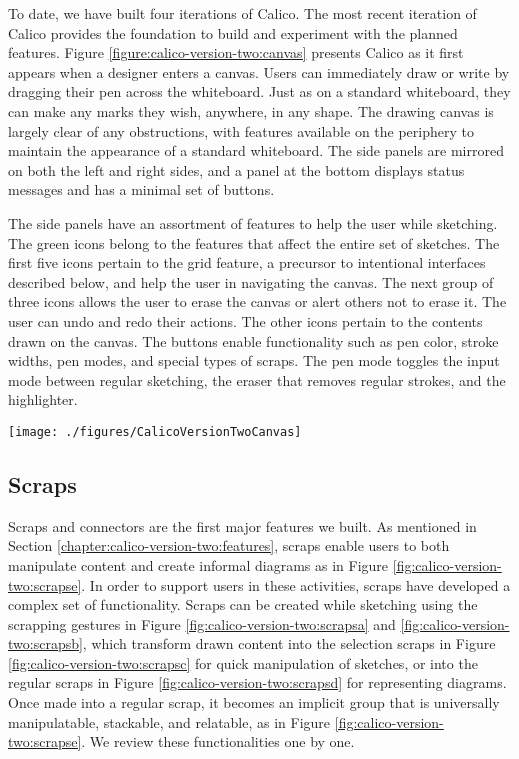 To date, we have built four iterations of Calico. The most recent iteration of Calico provides the foundation to build and experiment with the planned features. Figure \ref{figure:calico-version-two:canvas} presents Calico as it first appears when a designer enters a canvas. Users can immediately draw or write by dragging their pen across the whiteboard. Just as on a standard whiteboard, they can make any marks they wish, anywhere, in any shape. The drawing canvas is largely clear of any obstructions, with features available on the periphery to maintain the appearance of a standard whiteboard. The side panels are mirrored on both the left and right sides, and a panel at the bottom displays status messages and has a minimal set of buttons. 

The side panels have an assortment of features to help the user while sketching. The green icons belong to the features that affect the entire set of sketches. The first five icons pertain to the grid feature, a precursor to intentional interfaces described below, and help the user in navigating the canvas. The next group of three icons allows the user to erase the canvas or alert others not to erase it. The user can undo and redo their actions. The other icons pertain to the contents drawn on the canvas. The buttons enable functionality such as pen color, stroke widths, pen modes, and special types of scraps. The pen mode toggles the input mode between regular sketching, the eraser that removes regular strokes, and the highlighter.  

\begin{figure*}[tbh]
  \centering
  \texttt{[image: ./figures/CalicoVersionTwoCanvas]}
  \caption{The Calico canvas interface, including the side panels and the drawing space.}
  \label{figure:calico-version-two:canvas}
\end{figure*}

\subsection{Scraps}

Scraps and connectors are the first major features we built. As mentioned in Section \ref{chapter:calico-version-two:features}, scraps enable users to both manipulate content and create informal diagrams as in Figure \ref{fig:calico-version-two:scrapse}. In order to support users in these activities, scraps have developed a complex set of functionality. Scraps can be created while sketching using the scrapping gestures in Figure \ref{fig:calico-version-two:scrapsa} and \ref{fig:calico-version-two:scrapsb}, which transform drawn content into the selection scraps in Figure \ref{fig:calico-version-two:scrapsc} for quick manipulation of sketches, or into the regular scraps in Figure \ref{fig:calico-version-two:scrapsd} for representing diagrams. Once made into a regular scrap, it becomes an implicit group that is universally manipulatable, stackable, and relatable, as in Figure \ref{fig:calico-version-two:scrapse}. We review these functionalities one by one.

